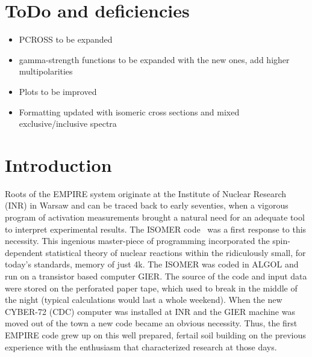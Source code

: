 \documentclass[twocolumn,amsmath,amssymb,10pt,groupedaddress,a4paper]{revtex4}
\begin{document}
\maketitle
{}
\lfoot{}
\rfoot{}
\setlength{\headrulewidth}{0.4pt}
\setlength{\footrulewidth}{0.4pt}

\newpage
\tableofcontents



\newpage
\section{ToDo and deficiencies}

\begin{itemize}
\item PCROSS to be expanded
\item gamma-strength functions to be expanded with the new ones, add higher multipolarities
\item Plots to be improved
\item Formatting updated with isomeric cross sections and mixed exclusive/inclusive spectra
\end{itemize}

\section{Introduction}
Roots of the EMPIRE system originate at the Institute of Nuclear Research (INR) in Warsaw and can be traced back to early seventies, when a vigorous program of activation measurements brought a natural need for an adequate  tool to interpret experimental results. The ISOMER code~\cite{Grochulski:73} was a first response to this necessity. This ingenious master-piece of programming incorporated the spin-dependent statistical theory of nuclear reactions within the ridiculously small, for today's standards, memory of just 4k. The ISOMER was coded in ALGOL and run on a transistor based computer GIER. The source of the code and input data were stored on the perforated paper tape, which used to break in the middle of the night (typical calculations would last a whole weekend). When the new CYBER-72 (CDC) computer was installed at INR and the GIER machine was moved out of the town a new code became an obvious necessity. Thus, the first EMPIRE code grew up on this well prepared, fertail soil building on the previous experience with the enthusiasm that characterized research at those days.
\end{document}
